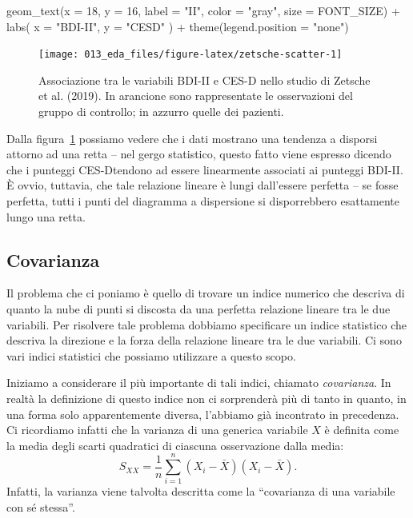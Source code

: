 \documentclass[
  10pt,
  italian,
  a4paper,
  extrafontsizes,onecolumn,openright
  ]{memoir}
\newenvironment{Shaded}{\begin{snugshade}}{\end{snugshade}}
\newcommand{\AttributeTok}[1]{\textcolor[rgb]{0.77,0.63,0.00}{#1}}
\newcommand{\DecValTok}[1]{\textcolor[rgb]{0.00,0.00,0.81}{#1}}
\newcommand{\FunctionTok}[1]{\textcolor[rgb]{0.00,0.00,0.00}{#1}}
\newcommand{\NormalTok}[1]{#1}
\newcommand{\SpecialCharTok}[1]{\textcolor[rgb]{0.00,0.00,0.00}{#1}}
\newcommand{\StringTok}[1]{\textcolor[rgb]{0.31,0.60,0.02}{#1}}
\newlength{\rf}
\theoremstyle{definition}
\theoremstyle{definition}
\theoremstyle{definition}
\theoremstyle{definition}
\theoremstyle{remark}
\begin{document}
\begin{Shaded}
\begin{Highlighting}[]
  \FunctionTok{geom\_text}\NormalTok{(}\AttributeTok{x =} \DecValTok{18}\NormalTok{, }\AttributeTok{y =} \DecValTok{16}\NormalTok{, }\AttributeTok{label =} \StringTok{"II"}\NormalTok{, }\AttributeTok{color =} \StringTok{"gray"}\NormalTok{, }\AttributeTok{size =}\NormalTok{ FONT\_SIZE) }\SpecialCharTok{+}
  \FunctionTok{labs}\NormalTok{(}
    \AttributeTok{x =} \StringTok{"BDI{-}II"}\NormalTok{,}
    \AttributeTok{y =} \StringTok{"CESD"}
\NormalTok{  ) }\SpecialCharTok{+}
  \FunctionTok{theme}\NormalTok{(}\AttributeTok{legend.position =} \StringTok{"none"}\NormalTok{)}
\end{Highlighting}
\end{Shaded}

\begin{figure}[h]

{\centering \texttt{[image: 013\_eda\_files/figure-latex/zetsche-scatter-1]} 

}

\caption{Associazione tra le variabili BDI-II e CES-D nello studio di Zetsche et al. (2019). In arancione sono rappresentate le osservazioni del gruppo di controllo; in azzurro quelle dei pazienti.}\label{fig:zetsche-scatter}
\end{figure}

Dalla figura~\ref{fig:zetsche-scatter} possiamo vedere che i dati mostrano una tendenza a disporsi attorno ad una retta -- nel gergo statistico, questo fatto viene espresso dicendo che i punteggi CES-Dtendono ad essere linearmente associati ai punteggi BDI-II. È ovvio, tuttavia, che tale relazione lineare è lungi dall'essere perfetta -- se fosse perfetta, tutti i punti del diagramma a dispersione si disporrebbero esattamente lungo una retta.

\hypertarget{covarianza}{%
\subsection{Covarianza}\label{covarianza}}

Il problema che ci poniamo è quello di trovare un indice numerico che
descriva di quanto la nube di punti si discosta da una perfetta
relazione lineare tra le due variabili. Per risolvere tale problema
dobbiamo specificare un indice statistico che descriva la direzione e la
forza della relazione lineare tra le due variabili. Ci sono vari indici
statistici che possiamo utilizzare a questo scopo.

Iniziamo a considerare il più importante di tali indici, chiamato
\emph{covarianza}. In realtà la definizione di questo indice non ci
sorprenderà più di tanto in quanto, in una forma solo apparentemente
diversa, l'abbiamo già incontrato in precedenza. Ci ricordiamo infatti
che la varianza di una generica variabile \(X\) è definita come la media
degli scarti quadratici di ciascuna osservazione dalla media:
\begin{equation}
S_{XX} = \frac{1}{n} \sum_{i=1}^n(X_i - \bar{X}) (X_i - \bar{X}).
\label{eq:variance2}
\end{equation}
Infatti, la varianza viene talvolta descritta come la ``covarianza di una
variabile con sé stessa''.
\end{document}
